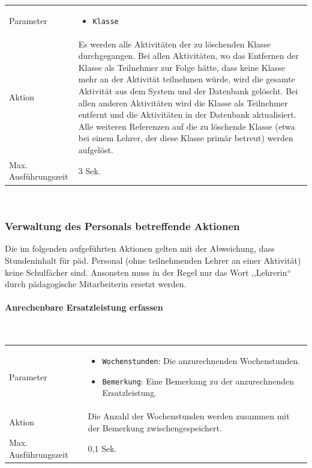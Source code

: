 \documentclass[fontsize=12pt,paper=a4,twoside]{scrartcl}
\begin{document}
\begin{tabularx}{\textwidth}{p{4cm}X}
Parameter & \begin{itemize}[itemsep=0pt, leftmargin = 0.5cm]
			\item \texttt{Klasse}
			\end{itemize}\\
Aktion & Es werden alle Aktivitäten der zu löschenden Klasse durchgegangen. Bei allen Aktivitäten, wo das Entfernen der Klasse als Teilnehmer zur Folge hätte, dass keine Klasse mehr an der Aktivität teilnehmen würde, wird die gesamte Aktivität aus dem System und der Datenbank gelöscht. Bei allen anderen Aktivitäten wird die Klasse als Teilnehmer entfernt und die Aktivitäten in der Datenbank aktualisiert. Alle weiteren Referenzen  auf die zu löschende Klasse (etwa bei einem Lehrer, der diese Klasse primär betreut) werden aufgelöst. \\
Max. Ausführungszeit & 3 Sek. 
\end{tabularx}\\


\subsubsection{Verwaltung des Personals betreffende Aktionen}

Die im folgenden aufgeführten Aktionen gelten mit der Abweichung, dass Stundeninhalt für päd. Personal (ohne teilnehmenden Lehrer an einer Aktivität) keine Schulfächer sind. Ansonsten muss in der Regel nur das Wort ,,Lehrerin`` durch pädagogische Mitarbeiterin ersetzt werden.\\

\paragraph{Anrechenbare Ersatzleistung erfassen}\mbox{}\\

\begin{tabularx}{\textwidth}{p{4cm}X}
Parameter & \begin{itemize}[itemsep=0pt, leftmargin = 0.5cm]
			\item \texttt{Wochenstunden}: Die anzurechnenden Wochenstunden.
			\item \texttt{Bemerkung}: Eine Bemerkung zu der anzurechnenden Ersatzleistung.
			\end{itemize}\\
Aktion & Die Anzahl der Wochenstunden werden zusammen mit der Bemerkung  zwischengespeichert.\\
Max. Ausführungszeit & 0,1 Sek. 
\end{tabularx}
\end{document}
